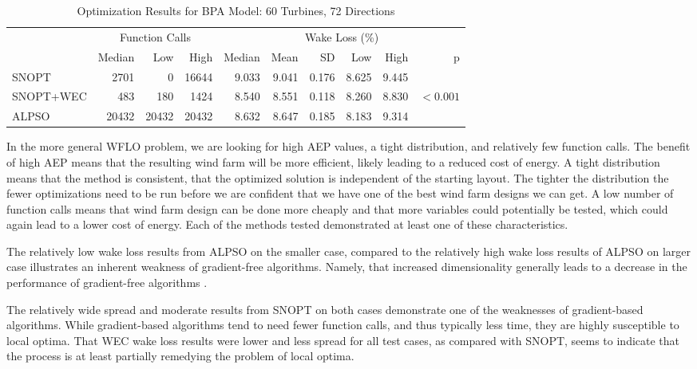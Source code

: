 \documentclass[a4paper]{jpconf}
\begin{document}
\begin{table}
	\centering
	\caption{Optimization Results for BPA Model: 60 Turbines, 72 Directions}
	\begin{tabular}{lrrrrrrrrr}
		\toprule
		{} & \multicolumn{3}{c}{Function Calls} & \multicolumn{6}{c}{Wake Loss (\%)} \\
		\cmidrule(lr){2-4} \cmidrule(lr){5-10}
		{} &         Median &    Low &   High &        Median &  Mean &    SD &   Low &  High &          p \\
		\cmidrule(lr){2-4} \cmidrule(lr){5-10}
		SNOPT     &           2701 &      0 &  16644 &         9.033 & 9.041 & 0.176 & 8.625 & 9.445 &            \\
		SNOPT+WEC &            483 &    180 &   1424 &         8.540 & 8.551 & 0.118 & 8.260 & 8.830 &  $< 0.001$ \\
		ALPSO     &          20432 &  20432 &  20432 &         8.632 & 8.647 & 0.185 & 8.183 & 9.314 &            \\
		\bottomrule
	\end{tabular}
\end{table}

In the more general WFLO problem, we are looking for high AEP values, a tight distribution, and relatively few function calls. The benefit of high AEP means that the resulting wind farm will be more efficient, likely leading to a reduced cost of energy. A tight distribution means that the method is consistent, that the optimized solution is independent of the starting layout. The tighter the distribution the fewer optimizations need to be run before we are confident that we have one of the best wind farm designs we can get. A low number of function calls means that wind farm design can be done more cheaply and that more variables could potentially be tested, which could again lead to a lower cost of energy. Each of the methods tested demonstrated at least one of these characteristics.

The relatively low wake loss results from ALPSO on the smaller case, compared to the relatively high wake loss results of ALPSO on larger case illustrates an inherent weakness of gradient-free algorithms. Namely, that increased dimensionality generally leads to a decrease in the performance of gradient-free algorithms \cite{rios2013-grad-free-comparison}.

The relatively wide spread and moderate results from SNOPT on both cases demonstrate one of the weaknesses of gradient-based algorithms. While gradient-based algorithms tend to need fewer function calls, and thus typically less time, they are highly susceptible to local optima. That WEC wake loss results were lower and less spread for all test cases, as compared with SNOPT, seems to indicate that the process is at least partially remedying the problem of local optima.
\end{document}
